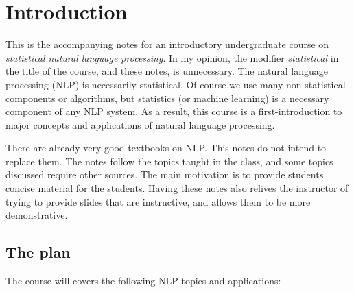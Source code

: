 \chapter{Introduction}
%
%
%

This is the accompanying notes
for an introductory undergraduate course on
\emph{statistical natural language processing}.
In my opinion, the modifier \emph{statistical} in the title of the course,
and these notes, is unnecessary.
The natural language processing (NLP) is necessarily statistical.
Of course we use many non-statistical components or algorithms,
but statistics (or machine learning) is a necessary component of any NLP system.
As a result, this course is a first-introduction to major concepts and applications of natural language processing.

There are already very good textbooks \parencite[notably][]{jurafsky2009,manning1999} on NLP.
This notes do not intend to replace them.
The notes follow the topics taught in the class,
and some topics discussed require other sources.
The main motivation is to provide students concise material for the students.
Having these notes also relives the instructor of trying to provide
slides that are instructive, and allows them to be more demonstrative.

\section{The plan}

The course will covers the following NLP topics and applications:

